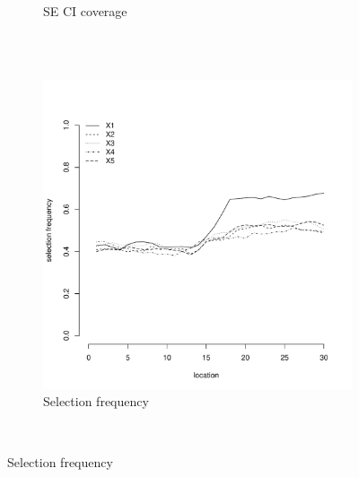 \documentclass[authoryear, review, 11pt]{elsarticle}
\begin{document}
\begin{figure}
\begin{subfigure}[b]{0.45\textwidth}
		\caption{SE CI coverage}
	\end{subfigure}%
	\\%
	~ %
	\begin{subfigure}[b]{0.45\textwidth}
	\centering
		\includegraphics[width=\textwidth]{../../figures/simulation/15.33.profile_selection.pdf}
		\caption{Selection frequency}
	\end{subfigure}
	~ %

\end{figure}
\end{document}
